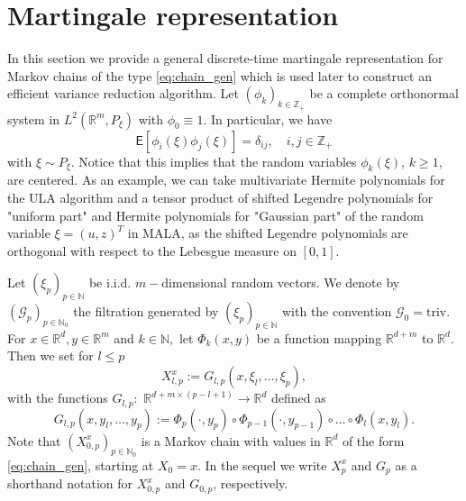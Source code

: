 \documentclass[bj]{imsart}
\def\nset{\mathbb{N}}
\def\rset{\mathbb{R}}
\def\rset{\mathbb{R}}
\begin{document}
\section{Martingale representation}
\label{seq:mart_repr}
In this section we provide a general discrete-time martingale representation for  Markov chains of the type  \eqref{eq:chain_gen} which is  used later to construct an efficient variance reduction algorithm. Let \((\phi_k)_{k\in \mathbb{Z}_+}\) be a complete orthonormal system in \(L^2(\mathbb{R}^m, P_{\xi})\) with \(\phi_0\equiv 1\).  In particular, we have
\begin{equation*}
\mathsf{E}[\phi_i(\xi)\phi_j(\xi)]=\delta_{ij},\quad i,j\in  \mathbb{Z}_{+}
\end{equation*}
with \(\xi \sim P_{\xi}.\)
Notice that this implies that the random variables
$\phi_k(\xi)$, $k\ge1$, are centered. As an example, we can take  multivariate Hermite polynomials for the ULA algorithm and a tensor product of shifted Legendre polynomials for "uniform part" and Hermite polynomials for "Gaussian part"  of the random variable $\xi = (u, z)^T$ in MALA, as the shifted Legendre polynomials are orthogonal with respect to the Lebesgue measure on \([0,1].\)
\par
Let  $(\xi_p)_{p \in \nset}$ be i.i.d. $m-$dimensional random vectors. We denote by $(\mathcal{G}_p)_{p \in \nset_0}$  the filtration generated by $(\xi_p)_{p \in \nset}$ with the convention $\mathcal{G}_0=\mathrm{triv}$. For  $x \in \rset^d, y \in \rset^{m}$ and $k \in \nset,$ let $\Phi_k(x,y)$ be a function mapping $\rset^{d+m}$ to $\rset^d$. Then we set for $l \le p$
\begin{equation}
\label{eq:ula_new}
X^x_{l,p}:=G_{l,p}(x,\xi_{l},\ldots,\xi_{p}),
\end{equation}
with the functions \(G_{l,p}:\) \(\rset^{d + m\times(p-l+1)}\to \rset^{d}\) defined as
\begin{equation}
\label{eq:definition-G-p-l}
G_{l,p}(x,y_l,\ldots,y_p):=\Phi_p(\cdot,y_{p})\circ\Phi_{p-1}(\cdot,y_{p-1})\circ\dots\circ\Phi_{l}(x,y_{l}).
\end{equation}
Note that $\left(X^x_{0,p}\right)_{p \in \nset_0}$ is a Markov chain with values in $\rset^d$ of the form \eqref{eq:chain_gen}, starting at $X_0 = x$. In the sequel we write $X^x_{p}$ and $G_{p}$ as a shorthand notation for $X^x_{0,p}$ and $G_{0,p}$, respectively.
\end{document}
